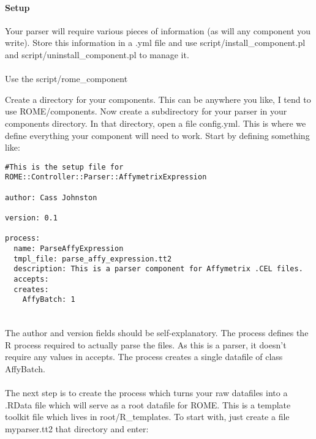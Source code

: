 \paragraph*{Setup}
Your parser will require various pieces of information (as will any component you write). Store this information in a .yml file and use script/install\_component.pl and script/uninstall\_component.pl to manage it. 

\paragraph*{}
Use the script/rome\_component


Create a directory for your components. This can be anywhere you like, I tend to use ROME/components. Now create a subdirectory for your parser in your components directory. In that directory, open a file config.yml. This is where we define everything your component will need to work. Start by defining something like:

\begin{verbatim}
#This is the setup file for ROME::Controller::Parser::AffymetrixExpression

author: Cass Johnston

version: 0.1

process: 
  name: ParseAffyExpression
  tmpl_file: parse_affy_expression.tt2
  description: This is a parser component for Affymetrix .CEL files.
  accepts:
  creates:
    AffyBatch: 1    
  
\end{verbatim}

\paragraph*{}
The author and version fields should be self-explanatory. The process defines the R process required to actually parse the files. As this is a parser, it doesn't require any values in accepts. The process creates a single datafile of class AffyBatch. 


\paragraph*{}
The next step is to create the process which turns your raw datafiles into a .RData file which will serve as a root datafile for ROME. This is a template toolkit file which lives in root/R\_templates. To start with, just create a file myparser.tt2 that directory and enter:

